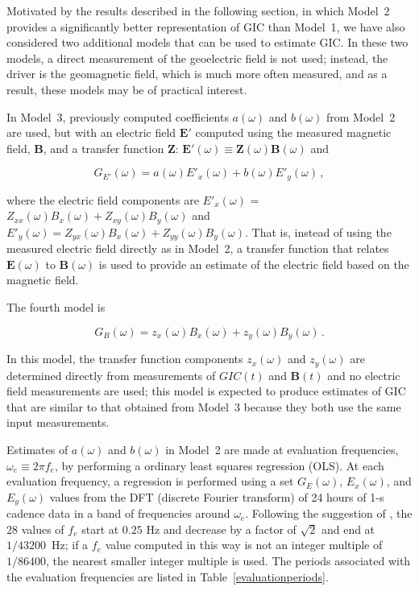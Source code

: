 \documentclass[draft,linenumbers]{agujournal2018}
\begin{document}
Motivated by the results described in the following section, in which Model~2 provides a significantly better representation of GIC than Model~1, we have also considered two additional models that can be used to estimate GIC. In these two models, a direct measurement of the geoelectric field is not used; instead, the driver is the geomagnetic field, which is much more often measured, and as a result, these models may be of practical interest.

In Model~3, previously computed coefficients $a(\omega)$ and $b(\omega)$ from Model~2 are used, but with an electric field $\mathbf{E}'$ computed using the measured magnetic field, $\mathbf{B}$, and a transfer function $\boldsymbol{Z}$: $\mathbf{E}'(\omega) \equiv \boldsymbol{Z}(\omega)\mathbf{B}(\omega)$ and

\setcounter{equation}{2}
\begin{linenomath*}
  \begin{equation}
    G_{E'}(\omega) = a(\omega)E'_x(\omega) + b(\omega)E'_y(\omega)\,,
    \label{model3}
  \end{equation}
\end{linenomath*}

\noindent
where the electric field components are $E'_x(\omega)$ = $Z_{xx}(\omega)B_x(\omega) + Z_{xy}(\omega)B_y(\omega)$ and $E'_y(\omega) = Z_{yx}(\omega)B_x(\omega) + Z_{yy}(\omega)B_y(\omega)$. That is, instead of using the measured electric field directly as in Model~2, a transfer function that relates $\mathbf{E}(\omega)$ to $\mathbf{B}(\omega)$ is used to provide an estimate of the electric field based on the magnetic field.

The fourth model is

\begin{linenomath*}
  \begin{equation}
    G_B(\omega) = z_x(\omega)B_x(\omega) + z_y(\omega)B_y(\omega)\,.
    \label{model4}
  \end{equation}
\end{linenomath*}

\noindent
In this model, the transfer function components $z_x(\omega)$ and $z_y(\omega)$ are determined directly from measurements of $GIC(t)$ and $\mathbf{B}(t)$ and no electric field measurements are used; this model is expected to produce estimates of GIC that are similar to that obtained from Model~3 because they both use the same input measurements.

Estimates of $a(\omega)$ and $b(\omega)$ in Model~2 are made at evaluation frequencies, $\omega_e \equiv 2\pi f_e$, by performing a ordinary least squares regression (OLS). At each evaluation frequency, a regression is performed using a set $G_E(\omega)$, $E_x(\omega)$, and $E_y(\omega)$ values from the DFT (discrete Fourier transform) of 24 hours of 1-s cadence data in a band of frequencies around $\omega_e$. Following the suggestion of \cite{Simpson2005}, the 28 values of $f_e$ start at $0.25$ Hz and decrease by a factor of $\sqrt{2}$ and end at $1/43200$~Hz; if a $f_e$ value computed in this way is not an integer multiple of $1/86400$, the nearest smaller integer multiple is used. The periods associated with the evaluation frequencies are listed in Table~\ref{evaluationperiods}.
\end{document}
